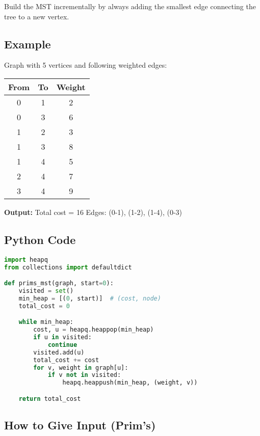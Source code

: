 \documentclass[14pt]{extarticle}
\begin{document}
\begin{tcolorbox}[colback=white, colframe=black, title=Key Idea]
Build the MST incrementally by always adding the smallest edge connecting the tree to a new vertex.
\end{tcolorbox}

\subsection*{Example}

Graph with 5 vertices and following weighted edges:

\begin{center}
\begin{tabular}{|c|c|c|}
\hline
From & To & Weight \\
\hline
0 & 1 & 2 \\
0 & 3 & 6 \\
1 & 2 & 3 \\
1 & 3 & 8 \\
1 & 4 & 5 \\
2 & 4 & 7 \\
3 & 4 & 9 \\
\hline
\end{tabular}
\end{center}

\textbf{Output:} Total cost = 16  
Edges: (0-1), (1-2), (1-4), (0-3)

\newpage

\subsection*{Python Code}
\begin{lstlisting}[language=Python]
import heapq
from collections import defaultdict

def prims_mst(graph, start=0):
    visited = set()
    min_heap = [(0, start)]  # (cost, node)
    total_cost = 0

    while min_heap:
        cost, u = heapq.heappop(min_heap)
        if u in visited:
            continue
        visited.add(u)
        total_cost += cost
        for v, weight in graph[u]:
            if v not in visited:
                heapq.heappush(min_heap, (weight, v))

    return total_cost
\end{lstlisting}

\subsection*{How to Give Input (Prim's)}
\end{document}
